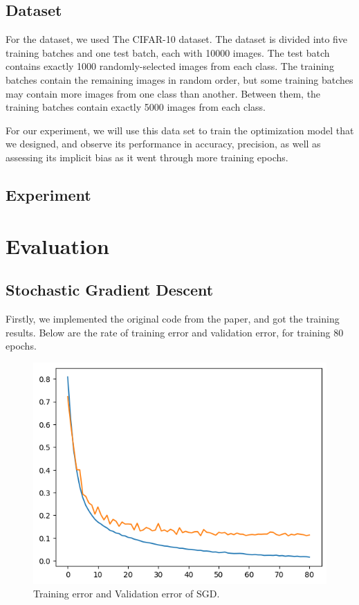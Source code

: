 \section{Dataset}

For the dataset, we used The CIFAR-10 dataset. The dataset is divided into five training batches and one test batch, each with 10000 images. The test batch contains exactly 1000 randomly-selected images from each class. The training batches contain the remaining images in random order, but some training batches may contain more images from one class than another. Between them, the training batches contain exactly 5000 images from each class.

For our experiment, we will use this data set to train the optimization model that we designed, and observe its performance in accuracy, precision, as well as assessing its implicit bias as it went through more training epochs.

\section{Experiment}

\chapter{Evaluation}
\section{Stochastic Gradient Descent}
Firstly, we implemented the original code from the paper, and got the training results. Below are the rate of training error and validation error, for training 80 epochs.

\begin{figure}[h]
    \centering %
        \includegraphics[width=0.8\linewidth]{./SGD.png} 
    \caption{Training error and Validation error of SGD.}
    \label{figure:sample figure} %
\end{figure}

